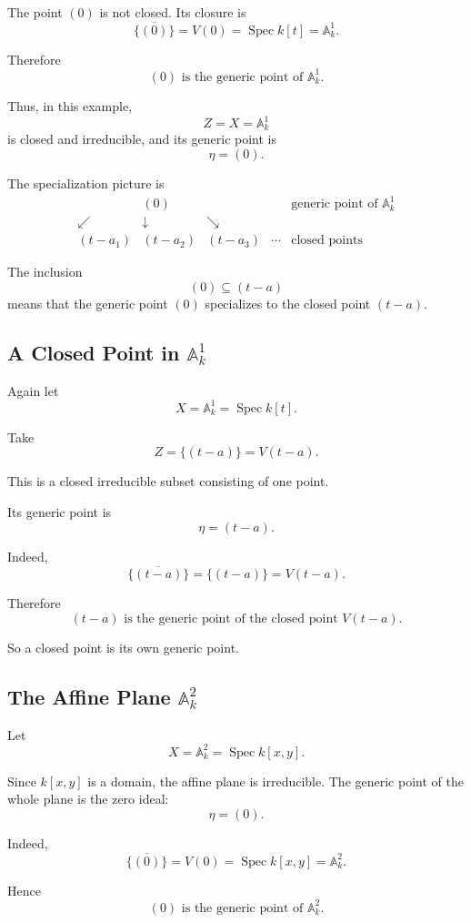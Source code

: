 \documentclass[12pt,a4paper]{article}
\theoremstyle{notespace}
\begin{document}
The point \((0)\) is not closed. Its closure is
\[
\overline{\{(0)\}}=V(0)=\operatorname{Spec} k[t]=\mathbb A^1_k.
\]

Therefore
\[
\boxed{(0)\text{ is the generic point of }\mathbb A^1_k.}
\]

Thus, in this example,
\[
Z=X=\mathbb A^1_k
\]
is closed and irreducible, and its generic point is
\[
\eta=(0).
\]

The specialization picture is
\[
\begin{array}{ccccc}
	& (0) & & & \text{generic point of } \mathbb A^1_k
	\\[0.6em]
	\swarrow & \downarrow & \searrow
	\\[0.6em]
	(t-a_1) & (t-a_2) & (t-a_3) & \cdots & \text{closed points}
\end{array}
\]

The inclusion
\[
(0)\subseteq (t-a)
\]
means that the generic point \((0)\) specializes to the closed point \((t-a)\).

\subsection{A Closed Point in \(\mathbb A^1_k\)}

Again let
\[
X=\mathbb A^1_k=\operatorname{Spec} k[t].
\]

Take
\[
Z=\{(t-a)\}=V(t-a).
\]

This is a closed irreducible subset consisting of one point.

Its generic point is
\[
\eta=(t-a).
\]

Indeed,
\[
\overline{\{(t-a)\}}=\{(t-a)\}=V(t-a).
\]

Therefore
\[
\boxed{(t-a)\text{ is the generic point of the closed point }V(t-a).}
\]

So a closed point is its own generic point.

\subsection{The Affine Plane \(\mathbb A^2_k\)}

Let
\[
X=\mathbb A^2_k=\operatorname{Spec} k[x,y].
\]

Since \(k[x,y]\) is a domain, the affine plane is irreducible. The generic point of the whole plane is the zero ideal:
\[
\eta=(0).
\]

Indeed,
\[
\overline{\{(0)\}}=V(0)=\operatorname{Spec} k[x,y]=\mathbb A^2_k.
\]

Hence
\[
\boxed{(0)\text{ is the generic point of }\mathbb A^2_k.}
\]
\end{document}
